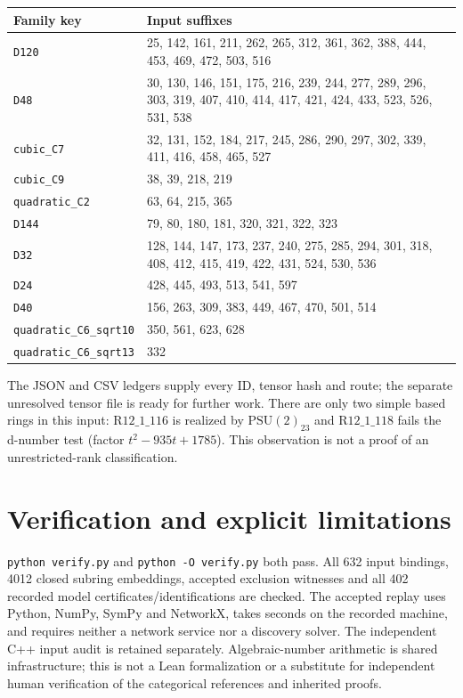 \documentclass[11pt]{article}
\begin{document}
\begin{center}\small\begin{longtable}{@{}p{44mm}p{112mm}@{}}\toprule Family key&Input suffixes\\\midrule\endhead
\texttt{D120} & 25, 142, 161, 211, 262, 265, 312, 361, 362, 388, 444, 453, 469, 472, 503, 516 \\
\texttt{D48} & 30, 130, 146, 151, 175, 216, 239, 244, 277, 289, 296, 303, 319, 407, 410, 414, 417, 421, 424, 433, 523, 526, 531, 538 \\
\texttt{cubic\_C7} & 32, 131, 152, 184, 217, 245, 286, 290, 297, 302, 339, 411, 416, 458, 465, 527 \\
\texttt{cubic\_C9} & 38, 39, 218, 219 \\
\texttt{quadratic\_C2} & 63, 64, 215, 365 \\
\texttt{D144} & 79, 80, 180, 181, 320, 321, 322, 323 \\
\texttt{D32} & 128, 144, 147, 173, 237, 240, 275, 285, 294, 301, 318, 408, 412, 415, 419, 422, 431, 524, 530, 536 \\
\texttt{D24} & 428, 445, 493, 513, 541, 597 \\
\texttt{D40} & 156, 263, 309, 383, 449, 467, 470, 501, 514 \\
\texttt{quadratic\_C6\_sqrt10} & 350, 561, 623, 628 \\
\texttt{quadratic\_C6\_sqrt13} & 332 \\
\bottomrule\end{longtable}\end{center}
The JSON and CSV ledgers supply every ID, tensor hash and route; the separate unresolved
tensor file is ready for further work. There are only two simple based rings in this
input: $\mathrm{R12\_1\_116}$ is realized by $\mathrm{PSU}(2)_{23}$ and
$\mathrm{R12\_1\_118}$ fails the d-number test (factor $t^2-935t+1785$).
This observation is not a proof of an unrestricted-rank classification.

\section{Verification and explicit limitations}
\texttt{python verify.py} and \texttt{python -O verify.py} both pass. All 632 input
bindings, 4012 closed subring embeddings, accepted exclusion witnesses and all
402 recorded model certificates/identifications are checked. The accepted replay
uses Python, NumPy, SymPy and NetworkX, takes seconds on the recorded machine,
and requires neither a network service nor a discovery solver. The independent
C++ input audit is retained separately. Algebraic-number arithmetic is shared
infrastructure; this is not a Lean formalization or a substitute for independent
human verification of the categorical references and inherited proofs.
\end{document}
